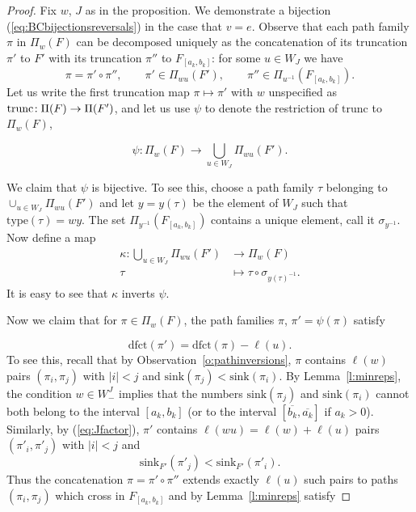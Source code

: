 \documentclass[12pt]{amsart}
\theoremstyle{definition}
\numberwithin{equation}{section}
\newcommand{\ol}[1]{\overline{#1}}
\newcommand{\Wejm}{W^J_-}
\newcommand{\dfct}{\mathrm{dfct}}
\newcommand{\trunc}{\mathrm{trunc}}
\newcommand{\snk}{\mathrm{sink}}
\newcommand{\type}{\mathrm{type}}
\newcommand{\ntnsp}{\negthinspace}
\begin{document}
  \begin{proof} 
  Fix $w$, $J$ as in the proposition.
  We demonstrate a bijection (\ref{eq:BCbijectionsreversals})
  in the case that $v = e$. Observe that each path family $\pi$ in $\Pi_w(F)$ can be decomposed uniquely as the concatenation of its truncation $\pi'$ to $F'$ with its truncation $\pi''$ to $F_{[a_k,b_k]}$: for some $u \in W_J$ we have 
  \begin{equation}\label{eq:pipi'pi''}
      \pi = \pi' \circ \pi'',\qquad
      \pi' \in \Pi_{wu}(F'), \qquad \pi'' \in \Pi_{u^{-1}}(F_{[a_k,b_k]}).
\end{equation}
      Let us write the first truncation map $\pi \mapsto \pi'$ with $w$ unspecified as $\trunc\ntnsp: \Pi(F) \rightarrow \Pi(F')$, and let us use $\psi$ to denote the restriction of $\trunc$ to $\Pi_w(F)$,
   
    \begin{equation}\label{eq:phidef}
    \psi:\Pi_w(F) \rightarrow \bigcup_{u \in W_J} \Pi_{wu}(F').
    \end{equation}

 We claim that $\psi$ is bijective. To see this, choose a path family $\tau$ belonging to $\cup_{u \in W_J} \Pi_{wu}(F')$ and let $y = y(\tau)$ be the element of $W_J$ such that $\type(\tau) = wy$. The set $\Pi_{y^{-1}}(F_{[a_k,b_k]})$ contains a unique element, call it $\sigma_{y^{-1}}$.
  Now define a map 
  \begin{equation}\label{eq:kappadef}
  \begin{aligned}
    \kappa: \bigcup_{u \in W_J} \Pi_{wu}(F') &\rightarrow \Pi_w(F)\\
    \tau &\mapsto \tau \circ \sigma_{y(\tau)^{-1}}.
    \end{aligned}
    \end{equation}
     It is easy to see that $\kappa$ inverts $\psi$. 

Now we claim that for $\pi \in \Pi_{w}(F)$, the path families $\pi$, $\pi' = \psi(\pi)$ satisfy

\begin{equation*}\dfct(\pi') = \dfct(\pi) - \ell(u).
\end{equation*}
To see this, recall that by Observation~\ref{o:pathinversions}, $\pi$ contains $\ell(w)$ pairs $(\pi_i,\pi_j)$ with $|i| < j$ and $\snk(\pi_j) < \snk(\pi_i)$.  By Lemma~\ref{l:minreps}, the condition $w \in \Wejm$ implies that the numbers $\snk(\pi_j)$ and $\snk(\pi_i)$ cannot both belong to the interval $[a_k,b_k]$
(or to the interval $[\ol{b_k},\ol{a_k}]$ if $a_k > 0$). Similarly, by (\ref{eq:Jfactor}), $\pi'$ contains $\ell(wu) = \ell(w) + \ell(u)$
pairs $(\pi'_i, \pi'_j)$ with $|i| < j$ and
\begin{equation}\label{eq:crossed}
    \snk_{F'}(\pi'_j) < \snk_{F'}(\pi'_i).
    \end{equation}
Thus the concatenation $\pi = \pi' \circ \pi''$ extends exactly
$\ell(u)$ such pairs to paths $(\pi_i,\pi_j)$ which cross in $F_{[a_k,b_k]}$ and by Lemma~\ref{l:minreps} satisfy


\end{proof}
\end{document}
